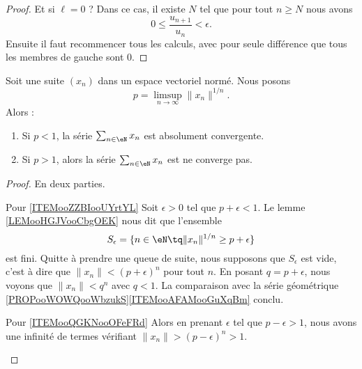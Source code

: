 \begin{proof}
	Et si \( \ell=0\) ? Dans ce cas, il existe \( N\) tel que pour tout \( n\geq N\) nous avons
	\begin{equation}
		0\leq \frac{ u_{n+1} }{ u_n }<\epsilon.
	\end{equation}
	Ensuite il faut recommencer tous les calculs, avec pour seule différence que tous les membres de gauche sont \( 0\).
\end{proof}


\begin{lemma}        \label{LEMooDWNZooXwejrF}
	Soit une suite \( (x_n)\) dans un espace vectoriel normé. Nous posons
	\begin{equation}
		p=\limsup_{n\to \infty}\| x_n \|^{1/n}.
	\end{equation}
	Alors :
	\begin{enumerate}
		\item       \label{ITEMooZZBIooUYrtYL}
		      Si \( p<1\), la série \( \sum_{n\in \eN}x_n\) est absolument convergente.
		\item       \label{ITEMooQGKNooOFeFRd}
		      Si \( p>1\), alors la série \( \sum_{n\in \eN}x_n\) est ne converge pas.
	\end{enumerate}
\end{lemma}

\begin{proof}
	En deux parties.
	\begin{subproof}
		\item[Pour \ref{ITEMooZZBIooUYrtYL}]
		Soit \( \epsilon>0\) tel que \( p+\epsilon<1\). Le lemme \ref{LEMooHGJVooCbgOEK} nous dit que l'ensemble
		\begin{equation}
			S_{\epsilon}=\{ n\in \eN\tq \| x_n \|^{1/n}\geq p+\epsilon \}
		\end{equation}
		est fini. Quitte à prendre une queue de suite, nous supposons que \( S_{\epsilon}\) est vide, c'est à dire que \( \| x_n \|<(p+\epsilon)^n\) pour tout \( n\). En posant \( q=p+\epsilon\), nous voyons que \( \| x_n \|<q^n\) avec \( q<1\). La comparaison avec la série géométrique \ref{PROPooWOWQooWbzukS}\ref{ITEMooAFAMooGuXqBm} conclu.
		\item[Pour \ref{ITEMooQGKNooOFeFRd}]
		Alors en prenant \( \epsilon\) tel que \( p-\epsilon>1\), nous avons une infinité de termes vérifiant \( \| x_n \|>(p-\epsilon)^n>1\).
	\end{subproof}
\end{proof}

